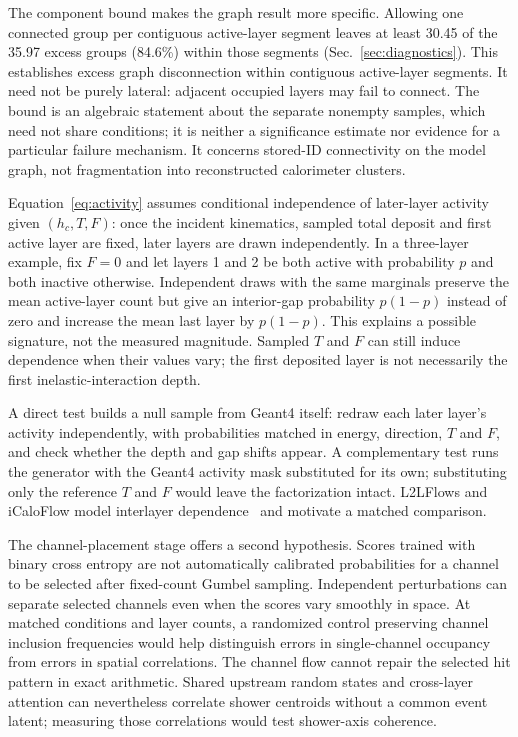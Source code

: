 \documentclass[10pt]{article}
\begin{document}
The component bound makes the graph result more specific. Allowing one connected group per contiguous active-layer segment leaves at least 30.45 of the 35.97 excess groups (84.6\%) within those segments (Sec.~\ref{sec:diagnostics}). This establishes excess graph disconnection within contiguous active-layer segments. It need not be purely lateral: adjacent occupied layers may fail to connect. The bound is an algebraic statement about the separate nonempty samples, which need not share conditions; it is neither a significance estimate nor evidence for a particular failure mechanism. It concerns stored-ID connectivity on the model graph, not fragmentation into reconstructed calorimeter clusters.

Equation~\eqref{eq:activity} assumes conditional independence of later-layer activity given $(h_c,T,F)$: once the incident kinematics, sampled total deposit and first active layer are fixed, later layers are drawn independently. In a three-layer example, fix $F=0$ and let layers 1 and 2 be both active with probability $p$ and both inactive otherwise. Independent draws with the same marginals preserve the mean active-layer count but give an interior-gap probability $p(1-p)$ instead of zero and increase the mean last layer by $p(1-p)$. This explains a possible signature, not the measured magnitude. Sampled $T$ and $F$ can still induce dependence when their values vary; the first deposited layer is not necessarily the first inelastic-interaction depth.

A direct test builds a null sample from Geant4 itself: redraw each later layer's activity independently, with probabilities matched in energy, direction, $T$ and $F$, and check whether the depth and gap shifts appear. A complementary test runs the generator with the Geant4 activity mask substituted for its own; substituting only the reference $T$ and $F$ would leave the factorization intact. L2LFlows and iCaloFlow model interlayer dependence~\cite{l2lflows,icaloflow} and motivate a matched comparison.

The channel-placement stage offers a second hypothesis. Scores trained with binary cross entropy are not automatically calibrated probabilities for a channel to be selected after fixed-count Gumbel sampling. Independent perturbations can separate selected channels even when the scores vary smoothly in space. At matched conditions and layer counts, a randomized control preserving channel inclusion frequencies would help distinguish errors in single-channel occupancy from errors in spatial correlations. The channel flow cannot repair the selected hit pattern in exact arithmetic. Shared upstream random states and cross-layer attention can nevertheless correlate shower centroids without a common event latent; measuring those correlations would test shower-axis coherence.
\end{document}
